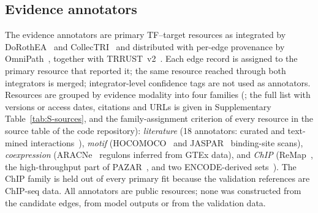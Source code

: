 \documentclass[11pt,a4paper]{article}
\begin{document}
\subsection{Evidence annotators}\label{sec:data-annotators}
The evidence annotators are primary TF--target resources as integrated by DoRothEA~\citep{garcia2019benchmark} and CollecTRI~\citep{mullerdott2023collectri} and distributed with per-edge provenance by OmniPath~\citep{turei2021omnipath}, together with TRRUST~v2~\citep{han2018trrust}.
Each edge record is assigned to the primary resource that reported it; the same resource reached through both integrators is merged; integrator-level confidence tags are not used as annotators.
Resources are grouped by evidence modality into four families (; the full list with versions or access dates, citations and URLs is given in Supplementary Table~\ref{tab:S-sources}, and the family-assignment criterion of every resource in the source table of the code repository):
\emph{literature} (18 annotators: curated and text-mined interactions~\citep{han2018trrust,vazquez2022extri,huang2019geredb,jiang2007tred,essaghir2010tfacts,bovolenta2012htridb,perfetto2016signor,chu2021curation,portales2009pazar,kanehisa2012kegg,carrascopro2018cytreg,orchard2014intact,huntley2015goa,lesurf2016oreganno,yusuf2012tfe,fantom2009transcriptional,kawaji2011fantom,gronostajski2011nfi}),
\emph{motif} (HOCOMOCO~\citep{kulakovskiy2018hocomoco} and JASPAR~\citep{khan2018jaspar} binding-site scans),
\emph{coexpression} (ARACNe~\citep{margolin2006reverse} regulons inferred from GTEx data), and
\emph{ChIP} (ReMap~\citep{cheneby2018remap}, the high-throughput part of PAZAR~\citep{portales2009pazar}, and two ENCODE-derived sets~\citep{gerstein2012architecture}).
The ChIP family is held out of every primary fit because the validation references are ChIP-seq data.
All annotators are public resources; none was constructed from the candidate edges, from model outputs or from the validation data.
\end{document}
